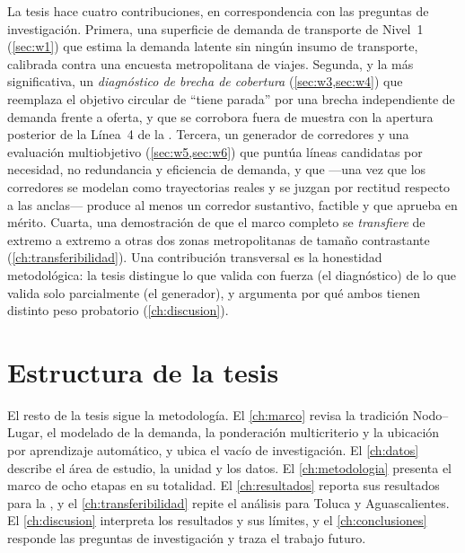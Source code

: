 La tesis hace cuatro contribuciones, en correspondencia con las preguntas de
investigación. Primera, una superficie de demanda de transporte de Nivel~1
(\cref{sec:w1}) que estima la demanda latente sin ningún insumo de transporte, calibrada
contra una encuesta metropolitana de viajes. Segunda, y la más significativa, un
\emph{diagnóstico de brecha de cobertura} (\cref{sec:w3,sec:w4}) que reemplaza el objetivo
circular de ``tiene parada'' por una brecha independiente de demanda frente a oferta, y que
se corrobora fuera de muestra con la apertura posterior de la Línea~4 de la \zmg. Tercera,
un generador de corredores y una evaluación multiobjetivo (\cref{sec:w5,sec:w6}) que puntúa
líneas candidatas por necesidad, no redundancia y eficiencia de demanda, y que ---una vez
que los corredores se modelan como trayectorias reales y se juzgan por rectitud respecto a
las anclas--- produce al menos un corredor sustantivo, factible y que aprueba en mérito.
Cuarta, una demostración de que el marco completo se \emph{transfiere} de extremo a extremo
a otras dos zonas metropolitanas de tamaño contrastante (\cref{ch:transferibilidad}). Una
contribución transversal es la honestidad metodológica: la tesis distingue lo que valida con
fuerza (el diagnóstico) de lo que valida solo parcialmente (el generador), y argumenta por
qué ambos tienen distinto peso probatorio (\cref{ch:discusion}).

\section{Estructura de la tesis}
\label{sec:intro-estructura}

El resto de la tesis sigue la metodología. El \cref{ch:marco} revisa la tradición
Nodo--Lugar, el modelado de la demanda, la ponderación multicriterio y la ubicación por
aprendizaje automático, y ubica el vacío de investigación. El \cref{ch:datos} describe el
área de estudio, la unidad \ageb y los datos. El \cref{ch:metodologia} presenta el marco de
ocho etapas en su totalidad. El \cref{ch:resultados} reporta sus resultados para la \zmg, y el
\cref{ch:transferibilidad} repite el análisis para Toluca y Aguascalientes. El
\cref{ch:discusion} interpreta los resultados y sus límites, y el \cref{ch:conclusiones}
responde las preguntas de investigación y traza el trabajo futuro.
